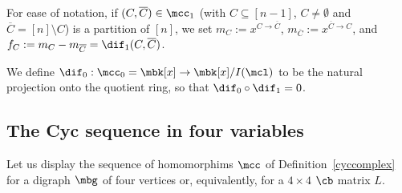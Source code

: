 \begin{notation}\label{fC}
For ease of notation, if $(C,\overline{C})\in \mcc_1$ (with
$C\subseteq [n-1]$, $C\neq\emptyset$ and $\overline{C}=[n]\setminus
C$) is a partition of $[n]$, we set $m_C:=x^{C\to\overline{C}}$,
$m_{\overline C}:=x^{\overline{C}\to C}$, and
$f_C:=m_C-m_{\overline{C}}=\dif_1(C,\overline{C})$.
\end{notation}

\begin{definition}\label{dif0}
 We define $\dif_0:\mcc_0=\mbk[x]\to \mbk[x]/I(\mcl)$ to be the
 natural projection onto the quotient ring, so that $\dif_0\circ
 \dif_1=0$.
\end{definition}

\subsection{The Cyc sequence in four variables}

 Let us display the sequence of homomorphims $\mcc$ of
Definition~\ref{cyccomplex} for a digraph $\mbg$ of four vertices or,
equivalently, for a $4\times 4$ $\cb$ matrix $L$.

